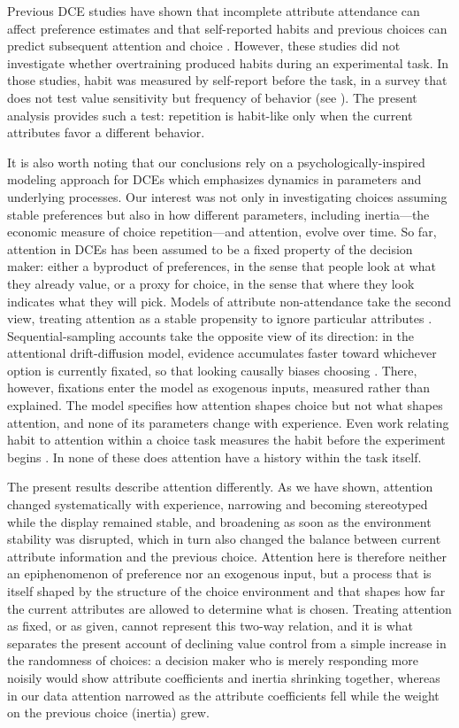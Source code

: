 \documentclass[man,natbib,floatsintext]{apa7}
\begin{document}
Previous DCE studies have shown that incomplete attribute attendance can affect preference estimates \citep{yegoryan2020} and that self-reported habits and previous choices can predict subsequent attention and choice \citep{blake2020}. However, these studies did not investigate whether overtraining produced habits during an experimental task. In those studies, habit was measured by self-report before the task, in a survey that does not test value sensitivity but frequency of behavior (see \cite{buyalskaya2023can}). The present analysis provides such a test: repetition is habit-like only when the current attributes favor a different behavior.

It is also worth noting that our conclusions rely on a psychologically-inspired modeling approach for DCEs which emphasizes dynamics in parameters and underlying processes. Our interest was not only in investigating choices assuming stable preferences but also in how different parameters, including inertia---the economic measure of choice repetition---and attention, evolve over time. So far, attention in DCEs has been assumed to be a fixed property of the decision maker: either a byproduct of preferences, in the sense that people look at what they already value, or a proxy for choice, in the sense that where they look indicates what they will pick. Models of attribute non-attendance take the second view, treating attention as a stable propensity to ignore particular attributes \citep{hole2011,yegoryan2020}. Sequential-sampling accounts take the opposite view of its direction: in the attentional drift-diffusion model, evidence accumulates faster toward whichever option is currently fixated, so that looking causally biases choosing \citep{krajbich2010,krajbichRangel2011}. There, however, fixations enter the model as exogenous inputs, measured rather than explained. The model specifies how attention shapes choice but not what shapes attention, and none of its parameters change with experience. Even work relating habit to attention within a choice task measures the habit before the experiment begins \citep{blake2020}. In none of these does attention have a history within the task itself.

The present results describe attention differently. As we have shown, attention changed systematically with experience, narrowing and becoming stereotyped while the display remained stable, and broadening as soon as the environment stability was disrupted, which in turn also changed the balance between current attribute information and the previous choice. Attention here is therefore neither an epiphenomenon of preference nor an exogenous input, but a process that is itself shaped by the structure of the choice environment and that shapes how far the current attributes are allowed to determine what is chosen. Treating attention as fixed, or as given, cannot represent this two-way relation, and it is what separates the present account of declining value control from a simple increase in the randomness of choices: a decision maker who is merely responding more noisily would show attribute coefficients and inertia shrinking together, whereas in our data attention narrowed as the attribute coefficients fell while the weight on the previous choice (inertia) grew.
\end{document}
